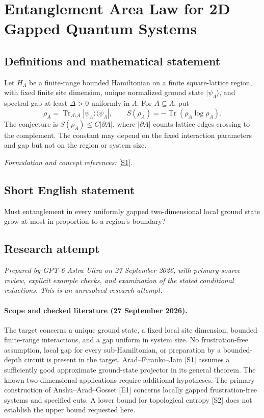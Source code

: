 \documentclass[11pt]{article}
\begin{document}
\section*{\texorpdfstring{Entanglement Area Law for 2D Gapped Quantum Systems}{Entanglement Area Law for 2D Gapped Quantum Systems}}\label{statement}
\subsection{Definitions and mathematical statement}
Let $H_\Lambda$ be a finite-range bounded Hamiltonian on a finite square-lattice region, with fixed finite site dimension, unique normalized ground state $|\psi_\Lambda\rangle$, and spectral gap at least $\Delta>0$ uniformly in $\Lambda$. For $A\subseteq\Lambda$, put
\[
 \rho_A=\operatorname{Tr}_{\Lambda\setminus A}|\psi_\Lambda\rangle\langle\psi_\Lambda|,
 \qquad S(\rho_A)=-\operatorname{Tr}(\rho_A\log\rho_A).
\]
The conjecture is $S(\rho_A)\le C|\partial A|$, where $|\partial A|$ counts lattice edges crossing to the complement. The constant may depend on the fixed interaction parameters and gap but not on the region or system size.
\par\smallskip\textit{Formulation and concept references:} \href{https://link.springer.com/article/10.1007/s00220-026-05554-z}{[S1]}.

\subsection{Short English statement}
Must entanglement in every uniformly gapped two-dimensional local ground state grow at most in proportion to a region's boundary?
\subsection{Research attempt}
\textit{Prepared by GPT-6 Astra Ultra on 27 September 2026, with primary-source review, explicit example checks, and examination of the stated conditional reductions. This is an unresolved research attempt.}

\paragraph{Scope and checked literature (27 September 2026).}
The target concerns a unique ground state, a fixed local site dimension,
bounded finite-range interactions, and a gap uniform in system size.
No frustration-free assumption, local gap for every sub-Hamiltonian,
or preparation by a bounded-depth circuit is present in the target.
Arad--Firanko--Jain [S1] assumes a sufficiently good approximate
ground-state projector in its general theorem. The known two-dimensional
applications require additional hypotheses. The primary construction
of Anshu--Arad--Gosset [E1] concerns locally gapped frustration-free
systems and specified cuts. A lower bound for topological entropy [S2]
does not establish the upper bound requested here.
\end{document}
